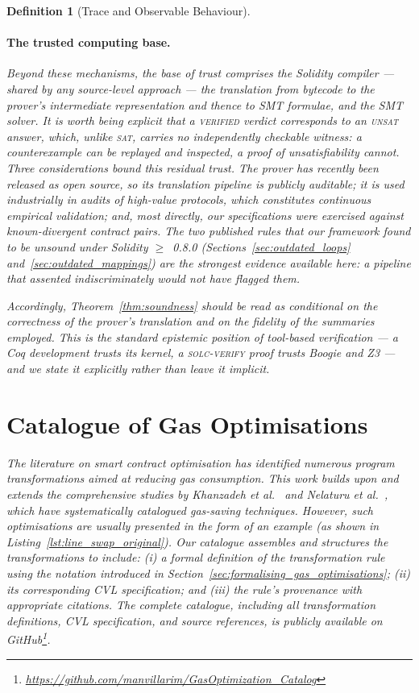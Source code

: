\documentclass[manuscript,screen,review]{acmart}
\newenvironment{revisedblock}{\color{red}}{}
\newtheorem{definition}{Definition}
\begin{document}
\begin{definition}[Trace and Observable Behaviour]
\begin{revisedblock}
\paragraph{The trusted computing base.}
Beyond these mechanisms, the base of trust comprises the Solidity compiler ---
shared by any source-level approach --- the translation from bytecode to the
prover's intermediate representation and thence to SMT formulae, and the SMT
solver. It is worth being explicit that a \textsc{verified} verdict corresponds
to an \textsc{unsat} answer, which, unlike \textsc{sat}, carries no
independently checkable witness: a counterexample can be replayed and
inspected, a proof of unsatisfiability cannot. Three considerations bound this
residual trust. The prover has recently been released as open source, so its
translation pipeline is publicly auditable; it is used industrially in audits
of high-value protocols, which constitutes continuous empirical validation;
and, most directly, our specifications were exercised against known-divergent
contract pairs. The two published rules that our framework found to be unsound
under Solidity $\geq$~0.8.0 (Sections~\ref{sec:outdated_loops}
and~\ref{sec:outdated_mappings}) are the strongest evidence available here: a
pipeline that assented indiscriminately would not have flagged them.

Accordingly, Theorem~\ref{thm:soundness} should be read as conditional on the
correctness of the prover's translation and on the fidelity of the summaries
employed. This is the standard epistemic position of tool-based verification
--- a Coq development trusts its kernel, a \textsc{solc-verify} proof trusts
Boogie and Z3 --- and we state it explicitly rather than leave it implicit.
\end{revisedblock}

\section{Catalogue of Gas Optimisations}
\label{sec:catalogue_gas_optimisations}

The literature on smart contract optimisation has identified numerous program transformations aimed at reducing gas consumption. This work builds upon and extends the comprehensive studies by Khanzadeh {\em et al.\/}~\cite{khanzadeh2023optimizing} and Nelaturu {\em et al.\/}~\cite{Nelaturu2021}, which have systematically catalogued gas-saving techniques. However, such optimisations are usually presented in the form of an example (as shown in Listing~\ref{lst:line_swap_original}). Our catalogue assembles and structures the transformations to include: (i) a formal definition of the transformation rule using the notation introduced in Section~\ref{sec:formalising_gas_optimisations}; (ii) its corresponding CVL specification; and (iii) the rule's provenance with appropriate citations. The complete catalogue, including all transformation definitions, CVL specification, and source references, is publicly available on GitHub\footnote{\url{https://github.com/manvillarim/GasOptimization_Catalog}}.


\end{definition}
\end{document}
